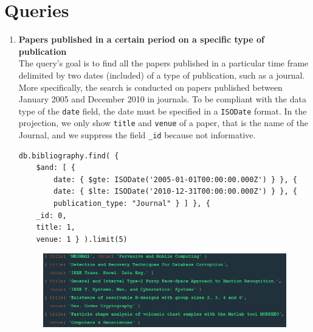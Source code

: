 \section{Queries}
\label{sec:queries_mongodb}%
\begin{enumerate}
    \item \textbf{Papers published in a certain period on a specific type of publication} \\
    The query's goal is to find all the papers published in a particular time frame delimited by two dates (included) of a type of publication, such as a journal.
    More specifically, the search is conducted on papers published between January 2005 and December 2010 in journals.
    To be compliant with the data type of the \verb|date| field, the date must be specified in a \verb|ISODate| format.
    In the projection, we only show \verb|title| and \verb|venue| of a paper, that is the name of the Journal, and we suppress the field \verb|_id| because not informative.
    \begin{lstlisting}[label={lst:query1mongodb}]
db.bibliography.find( {
    $and: [ {
        date: { $gte: ISODate('2005-01-01T00:00:00.000Z') } }, {
        date: { $lte: ISODate('2010-12-31T00:00:00.000Z') } }, {
        publication_type: "Journal" } ] }, {
    _id: 0,
    title: 1,
    venue: 1 } ).limit(5)
    \end{lstlisting}
    \begin{figure}[H]
        \begin{center}
            \includegraphics[width=0.9\linewidth]{ImagesMongoDB/query1mongodb}
            \label{fig:query1mongodb}%
        \end{center}
    \end{figure}


\end{enumerate}
